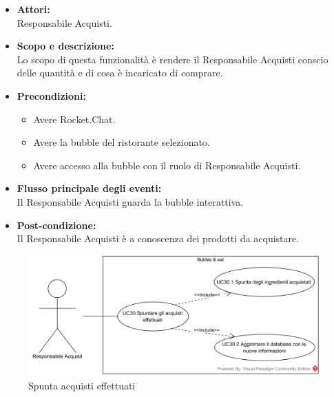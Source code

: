 
\begin{itemize}
	\item \textbf{Attori:}
	\\Responsabile Acquisti.
	\item \textbf{Scopo e descrizione:} 
	\\Lo scopo di questa funzionalità è rendere il Responsabile Acquisti conscio delle quantità e di cosa è incaricato di comprare.
	\item \textbf{Precondizioni:}
	\begin{itemize}
		\item Avere Rocket.Chat.
		\item Avere la bubble del ristorante selezionato.
		\item Avere accesso alla bubble con il ruolo di Responsabile Acquisti.
	\end{itemize}
	\item \textbf{Flusso principale degli eventi:}
	\\Il Responsabile Acquisti guarda la bubble interattiva.
	\item \textbf{Post-condizione:}
	\\Il Responsabile Acquisti è a conoscenza dei prodotti da acquistare.
\end{itemize}


\begin{figure}[H]
	\centering
	\includegraphics[width=15cm]{../../documenti/AnalisiDeiRequisiti/Diagrammi_img/usecase/uc3_8.png}
	\caption{\UCCaption{} Spunta acquisti effettuati}
\end{figure}

